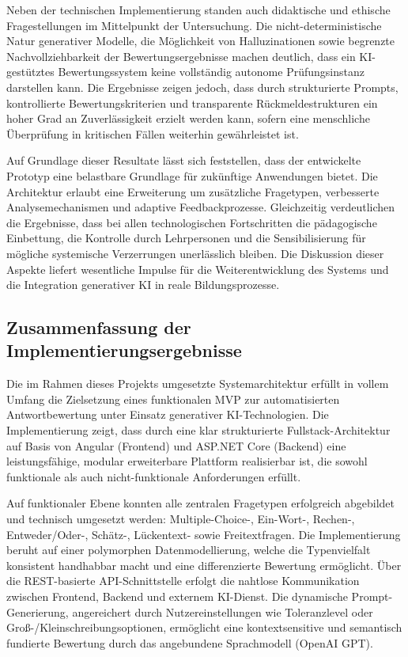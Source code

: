 \documentclass[a4paper,12pt]{article}
\begin{document}
Neben der technischen Implementierung standen auch didaktische und ethische Fragestellungen im Mittelpunkt der Untersuchung. Die nicht-deterministische Natur generativer Modelle, die Möglichkeit von Halluzinationen sowie begrenzte Nachvollziehbarkeit der Bewertungsergebnisse machen deutlich, dass ein KI-gestütztes Bewertungssystem keine vollständig autonome Prüfungsinstanz darstellen kann. Die Ergebnisse zeigen jedoch, dass durch strukturierte Prompts, kontrollierte Bewertungskriterien und transparente Rückmeldestrukturen ein hoher Grad an Zuverlässigkeit erzielt werden kann, sofern eine menschliche Überprüfung in kritischen Fällen weiterhin gewährleistet ist.

Auf Grundlage dieser Resultate lässt sich feststellen, dass der entwickelte Prototyp eine belastbare Grundlage für zukünftige Anwendungen bietet. Die Architektur erlaubt eine Erweiterung um zusätzliche Fragetypen, verbesserte Analysemechanismen und adaptive Feedbackprozesse. Gleichzeitig verdeutlichen die Ergebnisse, dass bei allen technologischen Fortschritten die pädagogische Einbettung, die Kontrolle durch Lehrpersonen und die Sensibilisierung für mögliche systemische Verzerrungen unerlässlich bleiben. Die Diskussion dieser Aspekte liefert wesentliche Impulse für die Weiterentwicklung des Systems und die Integration generativer KI in reale Bildungsprozesse.
\subsection{Zusammenfassung der Implementierungsergebnisse}
Die im Rahmen dieses Projekts umgesetzte Systemarchitektur erfüllt in vollem Umfang die Zielsetzung eines funktionalen MVP zur automatisierten Antwortbewertung unter Einsatz generativer KI-Technologien. Die Implementierung zeigt, dass durch eine klar strukturierte Fullstack-Architektur auf Basis von Angular (Frontend) und ASP.NET Core (Backend) eine leistungsfähige, modular erweiterbare Plattform realisierbar ist, die sowohl funktionale als auch nicht-funktionale Anforderungen erfüllt.

Auf funktionaler Ebene konnten alle zentralen Fragetypen erfolgreich abgebildet und technisch umgesetzt werden: Multiple-Choice-, Ein-Wort-, Rechen-, Entweder/Oder-, Schätz-, Lückentext- sowie Freitextfragen. Die Implementierung beruht auf einer polymorphen Datenmodellierung, welche die Typenvielfalt konsistent handhabbar macht und eine differenzierte Bewertung ermöglicht. Über die REST-basierte API-Schnittstelle erfolgt die nahtlose Kommunikation zwischen Frontend, Backend und externem KI-Dienst. Die dynamische Prompt-Generierung, angereichert durch Nutzereinstellungen wie Toleranzlevel oder Groß-/Kleinschreibungsoptionen, ermöglicht eine kontextsensitive und semantisch fundierte Bewertung durch das angebundene Sprachmodell (OpenAI GPT).
\end{document}
